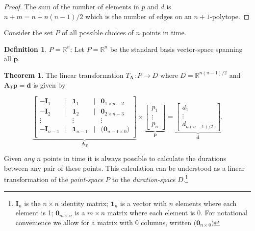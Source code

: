 \documentclass[12pt,oneside,a4paper]{article} %
\theoremstyle{definition}
\newtheorem{definition}{Definition}[section]
\newtheorem{theorem}{Theorem}[section]
\begin{document}
\begin{appendices}
\begin{proof} 
The sum of the number of elements in $p$ and $d$ is $n+m = n + n(n-1)/2$ which
is the number of edges on an $n+1$-polytope.
\end{proof}

Consider the set $P$ of all possible choices of $n$ points in time.

\begin{definition}{$P=\mathbb{R}^n$:}
Let $P=\mathbb{R}^n$ be the standard basis vector-space spanning all
$\textbf{p}$.
\end{definition}

\begin{theorem}
The linear transformation $T_\textbf{A}: P\rightarrow D$ where $D = \mathbb{R}^{n(n-1)/2}$ and $\textbf{A}_T \textbf{p} = \textbf{d}$ is given by

$$
\underbrace{\left[\begin{matrix}
-\textbf{I}_1 & \Big| & \textbf{1}_1 & \Big| & \textbf{0}_{1 \times n-2} \\
-\textbf{I}_2 & \Big| & \textbf{1}_2 & \Big| & \textbf{0}_{2 \times n-3} \\
\vdots & & \vdots & & \vdots \\
-\textbf{I}_{n-1} & \Big| & \textbf{1}_{n-1} & \Big| & \Big(\textbf{0}_{n-1 \times 0}\Big) \\
\end{matrix}\right]}_{\textbf{A}_T}
\times
\underbrace{\left[\begin{matrix}
p_1 \\ \vdots \\ p_n
\end{matrix}\right]}_{\textbf{p}}
=
\underbrace{\left[\begin{matrix}
d_1 \\ \vdots \\ d_{n(n-1)/2}
\end{matrix}\right]}_{\textbf{d}}.
$$

Given \textit{any} $n$ points in time it is always possible to calculate the
durations between any pair of these points. This calculation can be understood
as a linear transformation of the \textit{point-space} $P$ to the
\textit{duration-space} $D$.\footnote{ $\textbf{I}_n$ is the $n \times n$
identity matrix; $\textbf{1}_n$ is a vector with $n$ elements where each element is 1; $\textbf{0}_{m \times n}$ is a $m \times n$ matrix where each element is 0. For notational convenience we allow for a matrix with 0 columns, written $\Big(\textbf{0}_{n \times 0}\Big)$}
\end{theorem}


\end{appendices}
\end{document}
